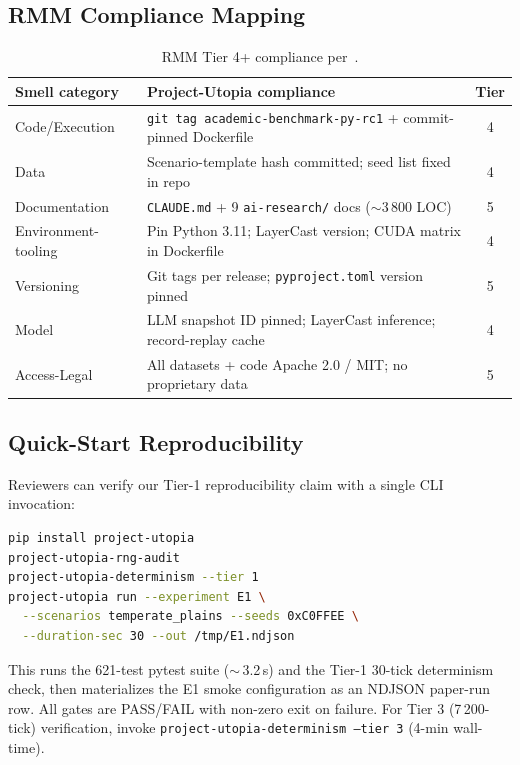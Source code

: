 \subsection{RMM Compliance Mapping}

\begin{table}[t]
\caption{RMM Tier 4+ compliance per~\citet{Siddiq2025SoftwareReproducibility}.}
\label{tab:rmm}
\centering
\small
\begin{tabularx}{\columnwidth}{lXc}
\toprule
Smell category & Project-Utopia compliance & Tier \\
\midrule
Code/Execution & \texttt{git tag academic-benchmark-py-rc1} + commit-pinned Dockerfile & 4 \\
Data & Scenario-template hash committed; seed list fixed in repo & 4 \\
Documentation & \texttt{CLAUDE.md} + 9 \texttt{ai-research/} docs ($\sim$3\,800 LOC) & 5 \\
Environment-tooling & Pin Python 3.11; LayerCast version; CUDA matrix in Dockerfile & 4 \\
Versioning & Git tags per release; \texttt{pyproject.toml} version pinned & 5 \\
Model & LLM snapshot ID pinned; LayerCast inference; record-replay cache & 4 \\
Access-Legal & All datasets + code Apache 2.0 / MIT; no proprietary data & 5 \\
\bottomrule
\end{tabularx}
\end{table}

\subsection{Quick-Start Reproducibility}

Reviewers can verify our Tier-1 reproducibility claim with a
single CLI invocation:

\begin{lstlisting}[caption={Quick-start verification},language=bash]
pip install project-utopia
project-utopia-rng-audit
project-utopia-determinism --tier 1
project-utopia run --experiment E1 \
  --scenarios temperate_plains --seeds 0xC0FFEE \
  --duration-sec 30 --out /tmp/E1.ndjson
\end{lstlisting}

\noindent
This runs the 621-test pytest suite ($\sim$\,3.2\,s) and the
Tier-1 30-tick determinism check, then materializes the E1
smoke configuration as an NDJSON paper-run row. All gates are
PASS/FAIL with non-zero exit on failure. For Tier 3
(7\,200-tick) verification, invoke
\texttt{project-utopia-determinism --tier 3} (4-min wall-time).

